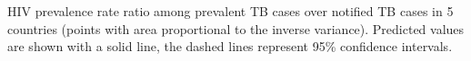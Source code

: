 \label{fig:hivratio}HIV prevalence rate ratio among prevalent TB cases over notified TB cases in 5 countries (points with area proportional to the inverse variance). Predicted values are shown with a solid line, the dashed lines represent 95\% confidence intervals.